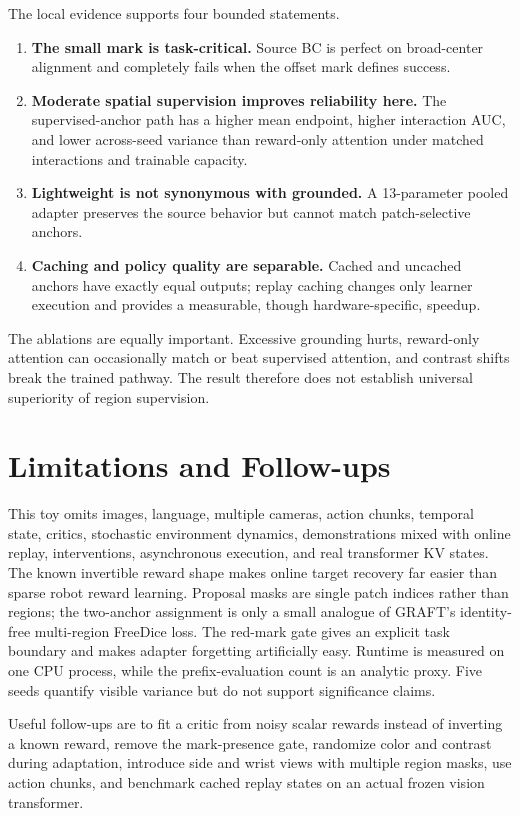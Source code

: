 \documentclass[11pt]{article}
\begin{document}
The local evidence supports four bounded statements.
\begin{enumerate}[leftmargin=1.5em]
  \item \textbf{The small mark is task-critical.} Source BC is perfect on broad-center alignment and completely fails when the offset mark defines success.
  \item \textbf{Moderate spatial supervision improves reliability here.} The supervised-anchor path has a higher mean endpoint, higher interaction AUC, and lower across-seed variance than reward-only attention under matched interactions and trainable capacity.
  \item \textbf{Lightweight is not synonymous with grounded.} A 13-parameter pooled adapter preserves the source behavior but cannot match patch-selective anchors.
  \item \textbf{Caching and policy quality are separable.} Cached and uncached anchors have exactly equal outputs; replay caching changes only learner execution and provides a measurable, though hardware-specific, speedup.
\end{enumerate}

The ablations are equally important. Excessive grounding hurts, reward-only attention can occasionally match or beat supervised attention, and contrast shifts break the trained pathway. The result therefore does not establish universal superiority of region supervision.

\section{Limitations and Follow-ups}

This toy omits images, language, multiple cameras, action chunks, temporal state, critics, stochastic environment dynamics, demonstrations mixed with online replay, interventions, asynchronous execution, and real transformer KV states. The known invertible reward shape makes online target recovery far easier than sparse robot reward learning. Proposal masks are single patch indices rather than regions; the two-anchor assignment is only a small analogue of GRAFT's identity-free multi-region FreeDice loss. The red-mark gate gives an explicit task boundary and makes adapter forgetting artificially easy. Runtime is measured on one CPU process, while the prefix-evaluation count is an analytic proxy. Five seeds quantify visible variance but do not support significance claims.

Useful follow-ups are to fit a critic from noisy scalar rewards instead of inverting a known reward, remove the mark-presence gate, randomize color and contrast during adaptation, introduce side and wrist views with multiple region masks, use action chunks, and benchmark cached replay states on an actual frozen vision transformer.
\end{document}
